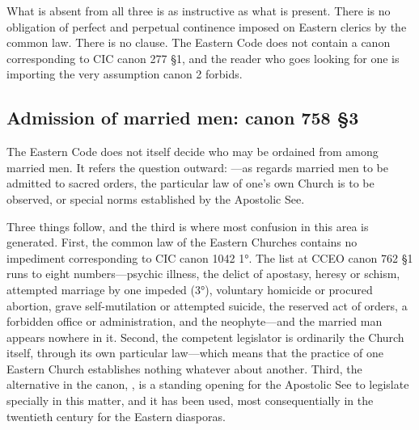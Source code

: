 What is absent from all three is as instructive as what is present. There is no obligation of perfect and perpetual continence imposed on Eastern clerics by the common law. There is no  clause. The Eastern Code does not contain a canon corresponding to CIC canon 277 §1, and the reader who goes looking for one is importing the very assumption canon 2 forbids.

\subsection{Admission of married men: canon 758 §3}

The Eastern Code does not itself decide who may be ordained from among married men. It refers the question outward: ---as regards married men to be admitted to sacred orders, the particular law of one's own Church  is to be observed, or special norms established by the Apostolic See.

Three things follow, and the third is where most confusion in this area is generated. First, the common law of the Eastern Churches contains no impediment corresponding to CIC canon 1042 1°. The list at CCEO canon 762 §1 runs to eight numbers---psychic illness, the delict of apostasy, heresy or schism, attempted marriage by one impeded (3°), voluntary homicide or procured abortion, grave self-mutilation or attempted suicide, the reserved act of orders, a forbidden office or administration, and the neophyte---and the married man appears nowhere in it. Second, the competent legislator is ordinarily the Church  itself, through its own particular law---which means that the practice of one Eastern Church establishes nothing whatever about another. Third, the alternative in the canon, , is a standing opening for the Apostolic See to legislate specially in this matter, and it has been used, most consequentially in the twentieth century for the Eastern diasporas.

